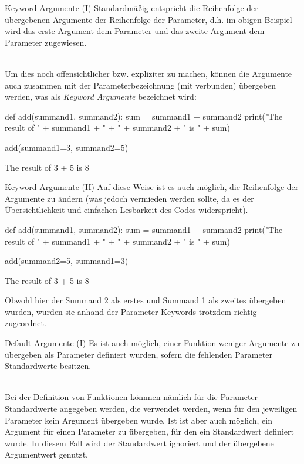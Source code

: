     \begin{frame}[fragile]{Keyword Argumente (I)}
        Standardmäßig entspricht die Reihenfolge der übergebenen Argumente der Reihenfolge der Parameter, d.h. im obigen Beispiel wird das erste Argument  dem Parameter  und das zweite Argument  dem Parameter  zugewiesen. \\~\
        
        Um dies noch offensichtlicher bzw. expliziter zu machen, können die Argumente auch zusammen mit der Parameterbezeichnung (mit \code{=} verbunden) übergeben werden, was als \textit{Keyword Argumente} bezeichnet wird:
        
\begin{pythoncode}
def add(summand1, summand2):
    sum = summand1 + summand2
    print("The result of " + summand1 + " + " + summand2 + " is " + sum)
    

add(summand1=3, summand2=5)

The result of 3 + 5 is 8
\end{pythoncode}
    \end{frame}
    
    \begin{frame}[fragile]{Keyword Argumente (II)}
        Auf diese Weise ist es auch möglich, die Reihenfolge der Argumente zu ändern (was jedoch vermieden werden sollte, da es der Übersichtlichkeit und einfachen Lesbarkeit des Codes widerspricht).
        
\begin{pythoncode}
def add(summand1, summand2):
    sum = summand1 + summand2
    print("The result of " + summand1 + " + " + summand2 + " is " + sum)
    

add(summand2=5, summand1=3)

The result of 3 + 5 is 8
\end{pythoncode}

        Obwohl hier der Summand 2 als erstes und Summand 1 als zweites übergeben wurden, wurden sie anhand der Parameter-Keywords trotzdem richtig zugeordnet.
    \end{frame}
    
    \begin{frame}[fragile]{Default Argumente (I)}
        Es ist auch möglich, einer Funktion weniger Argumente zu übergeben als Parameter definiert wurden, sofern die fehlenden Parameter Standardwerte besitzen. \\~\
        
        Bei der Definition von Funktionen könnnen nämlich für die Parameter Standardwerte angegeben werden, die verwendet werden, wenn für den jeweiligen Parameter kein Argument übergeben wurde. Ist ist aber auch möglich, ein Argument für einen Parameter zu übergeben, für den ein Standardwert definiert wurde. In diesem Fall wird der Standardwert ignoriert und der übergebene Argumentwert genutzt.
        
        
    \end{frame}
    
